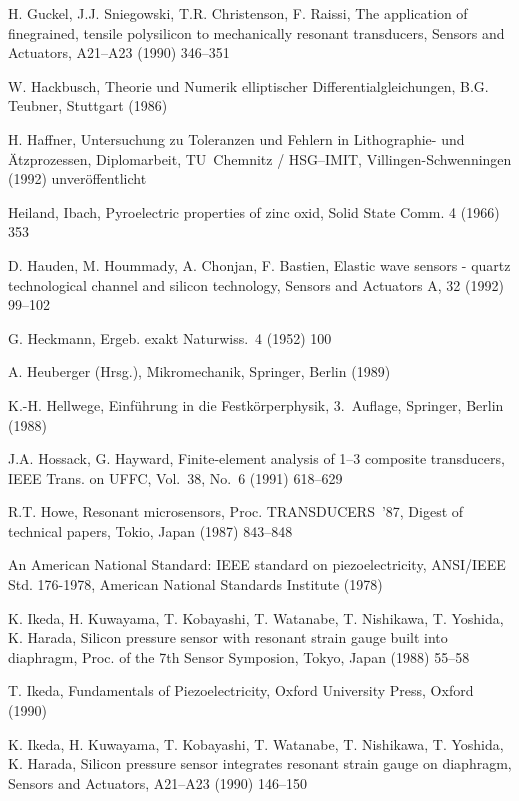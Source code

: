 \begin{thebibliography}{xxx}
 H. Guckel, J.J. Sniegowski, T.R. Christenson, F. Raissi, The application of
 finegrained, tensile polysilicon to mechanically resonant transducers,
 Sensors and Actuators, A21--A23 (1990) 346--351

 W. Hackbusch, Theorie und Numerik elliptischer Differentialgleichungen,
 B.G. Teubner, Stuttgart (1986)

 H. Haffner, Untersuchung zu Toleranzen und Fehlern in Lithographie- und
 Ätzprozessen, Diplomarbeit, TU~Chemnitz / HSG--IMIT, Villingen-Schwenningen
 (1992) unveröffentlicht

 Heiland, Ibach, Pyroelectric properties of zinc oxid, Solid State Comm.
 4 (1966) 353

  D. Hauden, M. Hoummady, A. Chonjan, F. Bastien, Elastic wave sensors -
  quartz technological channel and silicon technology, Sensors and Actuators
  A, 32 (1992) 99--102

  G. Heckmann, Ergeb. exakt Naturwiss.~4 (1952) 100

 A. Heuberger (Hrsg.), Mikromechanik, Springer, Berlin (1989)

 K.-H. Hellwege, Einführung in die Festkörperphysik, 3.~Auflage,
 Springer, Berlin (1988)

  J.A. Hossack, G. Hayward, Finite-element analysis of 1--3 composite
  transducers, IEEE Trans. on UFFC, Vol.~38, No.~6 (1991) 618--629

 R.T. Howe, Resonant microsensors, Proc. TRANSDUCERS~'87, Digest of
 technical papers, Tokio, Japan (1987) 843--848

 An American National Standard: IEEE standard on piezoelectricity,
 ANSI/IEEE Std. 176-1978, American National Standards Institute (1978)

 K. Ikeda, H. Kuwayama, T. Kobayashi, T. Watanabe, T. Nishikawa, T. Yoshida,
 K. Harada, Silicon pressure sensor with resonant strain gauge built into
 diaphragm, Proc. of the 7th Sensor Symposion, Tokyo, Japan (1988) 55--58

 T. Ikeda, Fundamentals of Piezoelectricity, Oxford University Press,
 Oxford (1990)

 K. Ikeda, H. Kuwayama, T. Kobayashi, T. Watanabe, T. Nishikawa, T. Yoshida,
 K. Harada, Silicon pressure sensor integrates resonant strain gauge on
 diaphragm, Sensors and Actuators, A21--A23 (1990) 146--150


\end{thebibliography}
